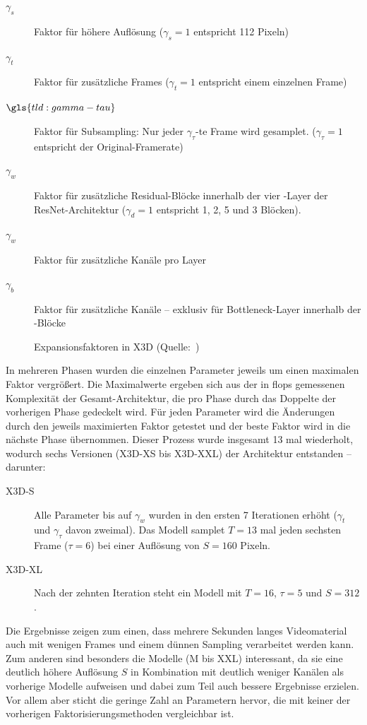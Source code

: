 \begin{description}
    \item[$\gamma_s$] Faktor für höhere Auflösung ($\gamma_s = 1$ entspricht 112 Pixeln)
    \item[$\gamma_t$] Faktor für zusätzliche Frames ($\gamma_t = 1$ entspricht einem einzelnen Frame)
    \item[$\gls{tld:gamma-tau}$] Faktor für Subsampling: Nur jeder $\gamma_\tau$-te Frame wird gesamplet. ($\gamma_\tau = 1$ entspricht der Original-Framerate)
    \item[$\gamma_w$] Faktor für zusätzliche Residual-Blöcke innerhalb der vier \res-Layer der ResNet-Architektur ($\gamma_d = 1$ entspricht 1, 2, 5 und 3 Blöcken).
    \item[$\gamma_w$] Faktor für zusätzliche Kanäle pro Layer
    \item[$\gamma_b$] Faktor für zusätzliche Kanäle -- exklusiv für Bottleneck-Layer innerhalb der \res-Blöcke
\end{description}

\begin{figure}[h!]
    \centering
    \caption{Expansionsfaktoren in X3D (Quelle:~\cite{Feichtenhofer20})}
    \label{fig:x3d}
\end{figure}

In mehreren Phasen wurden die einzelnen Parameter jeweils um einen maximalen Faktor vergrößert.
Die Maximalwerte ergeben sich aus der in \gls{flops} gemessenen Komplexität der Gesamt-Architektur, die pro Phase durch das Doppelte der vorherigen Phase gedeckelt wird.
Für jeden Parameter wird die Änderungen durch den jeweils maximierten Faktor getestet und der beste Faktor wird in die nächste Phase übernommen.
Dieser Prozess wurde insgesamt 13 mal wiederholt, wodurch sechs Versionen (X3D-XS bis X3D-XXL) der Architektur entstanden -- darunter:

\begin{description}
    \item[X3D-S] Alle Parameter bis auf $\gamma_w$ wurden in den ersten 7 Iterationen erhöht ($\gamma_t$ und $\gamma_\tau$ davon zweimal).
    Das Modell samplet $T=13$ mal jeden sechsten Frame ($\tau = 6$) bei einer Auflösung von $S=160$ Pixeln.
    \item[X3D-XL] Nach der zehnten Iteration steht ein Modell mit $T=16$, $\tau = 5$ und $S=312$.
\end{description}

Die Ergebnisse zeigen zum einen, dass mehrere Sekunden langes Videomaterial auch mit wenigen Frames und einem dünnen Sampling verarbeitet werden kann.
Zum anderen sind besonders die Modelle (M bis XXL) interessant, da sie eine deutlich höhere Auflösung $S$ in Kombination mit deutlich weniger Kanälen als vorherige Modelle aufweisen und dabei zum Teil auch bessere Ergebnisse erzielen.
Vor allem aber sticht die geringe Zahl an Parametern hervor, die mit keiner der vorherigen Faktorisierungsmethoden vergleichbar ist.


